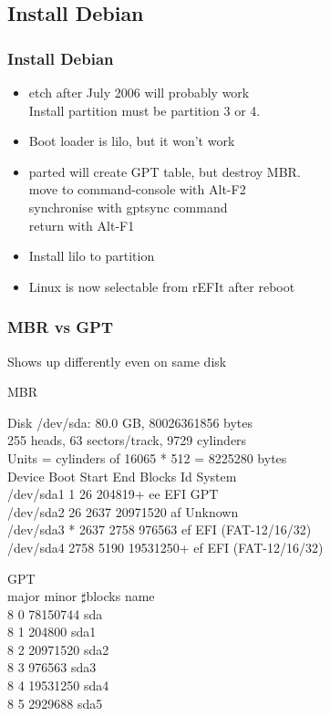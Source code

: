 \documentclass[cjk,dvipdfmx]{beamer}
\begin{document}
\subsection{Install Debian}

\begin{frame}
 \frametitle{Install Debian}
\begin{itemize}
 \item etch after July 2006 will probably work\\
       Install partition must be partition 3 or 4.
 \item Boot loader is lilo, but it won't work
 \item parted will create GPT table, but destroy MBR.\\
       move to command-console with Alt-F2\\
       synchronise with gptsync command\\
       return with Alt-F1
 \item Install lilo to partition
 \item Linux is now selectable from rEFIt after reboot
\end{itemize}
\end{frame}

\begin{frame}
\frametitle{MBR vs GPT}
Shows up differently even on same disk\\
\begin{minipage}[t]{0.68\hsize} 
MBR

{\scriptsize
 Disk /dev/sda: 80.0 GB, 80026361856 bytes\\
255 heads, 63 sectors/track, 9729 cylinders\\
Units = cylinders of 16065 * 512 = 8225280 bytes\\

   Device Boot      Start         End      Blocks   Id  System\\
/dev/sda1               1          26      204819+  ee  EFI GPT\\
/dev/sda2              26        2637    20971520   af  Unknown\\
/dev/sda3   *        2637        2758      976563   ef  EFI (FAT-12/16/32)\\
/dev/sda4            2758        5190    19531250+  ef  EFI (FAT-12/16/32)\\
}
\end{minipage}
\begin{minipage}[t]{0.30\hsize}
GPT\\

{\small
 major minor  $\sharp{}$blocks  name\\

   8     0   78150744 sda\\
   8     1     204800 sda1\\
   8     2   20971520 sda2\\
   8     3     976563 sda3\\
   8     4   19531250 sda4\\
   8     5    2929688 sda5\\
}
\end{minipage}
\end{frame}
\end{document}
